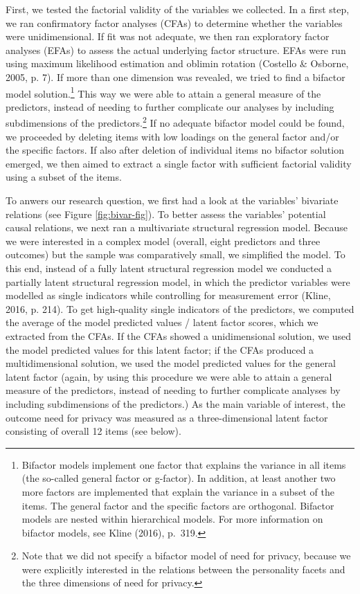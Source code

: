 \documentclass[man,floatsintext]{apa6}
\let\rmarkdownfootnote\footnote%
\def\footnote{\protect\rmarkdownfootnote}
\begin{document}
First, we tested the factorial validity of the variables we collected. In a first step, we ran confirmatory factor analyses (CFAs) to determine whether the variables were unidimensional. If fit was not adequate, we then ran exploratory factor analyses (EFAs) to assess the actual underlying factor structure. EFAs were run using maximum likelihood estimation and oblimin rotation (Costello \& Osborne, 2005, p. 7). If more than one dimension was revealed, we tried to find a bifactor model solution.\footnote{Bifactor models implement one factor that explains the variance in all items (the so-called general factor or g-factor). In addition, at least another two more factors are implemented that explain the variance in a subset of the items. The general factor and the specific factors are orthogonal. Bifactor models are nested within hierarchical models. For more information on bifactor models, see Kline (2016), p.~319.} This way we were able to attain a general measure of the predictors, instead of needing to further complicate our analyses by including subdimensions of the predictors.\footnote{Note that we did not specify a bifactor model of need for privacy, because we were explicitly interested in the relations between the personality facets and the three dimensions of need for privacy.} If no adequate bifactor model could be found, we proceeded by deleting items with low loadings on the general factor and/or the specific factors. If also after deletion of individual items no bifactor solution emerged, we then aimed to extract a single factor with sufficient factorial validity using a subset of the items.

To anwers our research question, we first had a look at the variables' bivariate relations (see Figure \ref{fig:bivar-fig}). To better assess the variables' potential causal relations, we next ran a multivariate structural regression model. Because we were interested in a complex model (overall, eight predictors and three outcomes) but the sample was comparatively small, we simplified the model. To this end, instead of a fully latent structural regression model we conducted a partially latent structural regression model, in which the predictor variables were modelled as single indicators while controlling for measurement error (Kline, 2016, p. 214). To get high-quality single indicators of the predictors, we computed the average of the model predicted values / latent factor scores, which we extracted from the CFAs. If the CFAs showed a unidimensional solution, we used the model predicted values for this latent factor; if the CFAs produced a multidimensional solution, we used the model predicted values for the general latent factor (again, by using this procedure we were able to attain a general measure of the predictors, instead of needing to further complicate analyses by including subdimensions of the predictors.) As the main variable of interest, the outcome need for privacy was measured as a three-dimensional latent factor consisting of overall 12 items (see below).
\end{document}
